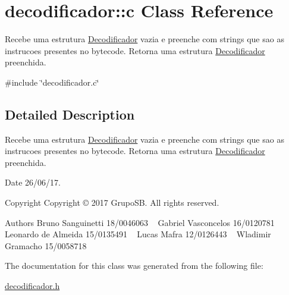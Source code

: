 \hypertarget{classdecodificador_1_1c}{}\section{decodificador\+:\+:c Class Reference}
\label{classdecodificador_1_1c}


Recebe uma estrutura \hyperlink{structDecodificador}{Decodificador} vazia e preenche com strings que sao as instrucoes presentes no bytecode. Retorna uma estrutura \hyperlink{structDecodificador}{Decodificador} preenchida.  




{\ttfamily \#include \char`\"{}decodificador.\+c\char`\"{}}



\subsection{Detailed Description}
Recebe uma estrutura \hyperlink{structDecodificador}{Decodificador} vazia e preenche com strings que sao as instrucoes presentes no bytecode. Retorna uma estrutura \hyperlink{structDecodificador}{Decodificador} preenchida. 

\begin{DoxyDate}{Date}
26/06/17. 
\end{DoxyDate}
\begin{DoxyCopyright}{Copyright}
Copyright © 2017 Grupo\+SB. All rights reserved.
\end{DoxyCopyright}
\begin{DoxyAuthor}{Authors}
Bruno Sanguinetti 18/0046063 ~\newline
Gabriel Vasconcelos 16/0120781 ~\newline
Leonardo de Almeida 15/0135491 ~\newline
Lucas Mafra 12/0126443 ~\newline
Wladimir Gramacho 15/0058718 ~\newline

\end{DoxyAuthor}


The documentation for this class was generated from the following file\+:\begin{DoxyCompactItemize}
\item 
\hyperlink{decodificador_8h}{decodificador.\+h}\end{DoxyCompactItemize}
